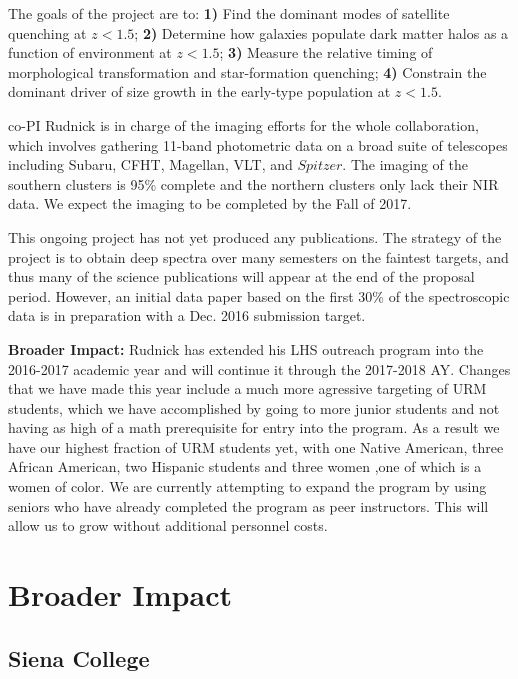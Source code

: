 \documentclass[11pt, preprint]{aastex}
\begin{document}
{The goals of the project are to: \textbf{1)} Find the dominant modes
of satellite quenching at $z<1.5$; \textbf{2)} Determine how galaxies
populate dark matter halos as a function of environment at $z<1.5$;
\textbf{3)} Measure the relative timing of morphological
transformation and star-formation quenching; \textbf{4)} Constrain the
dominant driver of size growth in the early-type population at
\boldmath$z<1.5$.  

co-PI Rudnick is in charge of the imaging efforts for the whole
collaboration, which involves gathering 11-band photometric data on a broad suite of
telescopes including Subaru, CFHT, Magellan, VLT, and $Spitzer$.  The
imaging of the southern clusters is 95\% complete and the northern
clusters only lack their NIR data.  We expect the imaging to be
completed by the Fall of 2017.

This ongoing project has not yet produced any publications.  The strategy of the project is to obtain deep spectra over many
semesters on the faintest targets, and thus many of the science
publications will appear at the end of the proposal period.  However,
an initial data paper based on the first 30\% of the spectroscopic
data is in preparation with a Dec. 2016 submission target.

\textbf{Broader Impact:} Rudnick has extended his LHS outreach program
into the 2016-2017 academic year and will continue it through the
2017-2018 AY.  Changes that we have made this year include a much more
agressive targeting of URM students, which we have accomplished by
going to more junior students and not having as high of a math
prerequisite for entry into the program.  As a result we have our
highest fraction of URM students yet, with one Native American, three
African American, two Hispanic students and three women ,one of which
is a women of color.  We are currently attempting to expand the
program by using seniors who have already completed the program as
peer instructors.  This will allow us to grow without additional
personnel costs.

\vspace*{-.7cm}
\section{Broader Impact}

\vspace*{-.4cm}
\subsection{Siena College}
\vspace*{-.4cm}

}
\end{document}
